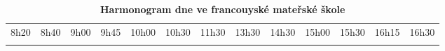 \begin{landscape}
\begin{table}
	\shorthandoff{-}
	\begin{tabular}{
	|p{10mm}
	|p{10mm}
	|p{23mm}
	|p{8mm}
	|p{15mm}
	|p{27mm}
	|p{18mm} %
	|p{30mm}
	|p{15mm}
	|p{15mm}
	|p{23mm}
	|p{7mm}
	|p{0mm}}
		\multicolumn{1}{l}{\hspace{-5mm}8h20} & 
		\multicolumn{1}{l}{\hspace{-5mm}8h40} &  	%
		\multicolumn{1}{l}{\hspace{-5mm}9h00} &  	%
		\multicolumn{1}{l}{\hspace{-5mm}9h45} & 	%
		\multicolumn{1}{l}{\hspace{-8mm}10h00} & 	%
		\multicolumn{1}{l}{\hspace{-8mm}10h30} &  	%
		\multicolumn{1}{l}{\hspace{-8mm}11h30} &  	%
		\multicolumn{1}{l}{\hspace{-8mm}13h30} &  	%
		\multicolumn{1}{l}{\hspace{-8mm}14h30} &  	%
		\multicolumn{1}{l}{\hspace{-8mm}15h00} & 	%
		\multicolumn{1}{l}{\hspace{-8mm}15h30} &  	%
		\multicolumn{1}{l}{\hspace{-8mm}16h15} &  	%
		\multicolumn{1}{l}{\hspace{-8mm}16h30}  \\ 	%
		\cline{1-6}\cline{8-12}
		 & & & & \cellcolor{gray!50} & & & & &  \cellcolor{gray!50}& & &
		 \multicolumn{1}{l}{} \\ [15mm]
		 \cline{1-6}\cline{8-12}
	\end{tabular}
	\hfill
	\caption{\textbf{Harmonogram dne ve francouyské mateřské škole}}
\end{table}


\end{landscape}
